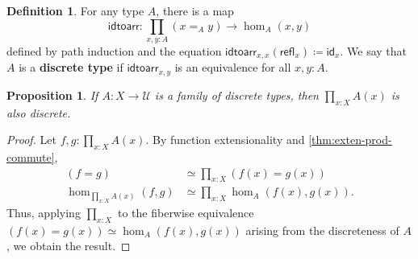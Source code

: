 \documentclass{amsart}
\theoremstyle{plain}
\newtheorem{prop}[thm]{Proposition}
\theoremstyle{definition}
\newtheorem{defn}[thm]{Definition}
\theoremstyle{remark}
\numberwithin{equation}{section}
\newcommand{\defeq}{\coloneqq}
\newcommand{\univtype}{\mathcal{U}}
\newcommand{\refl}{\mathsf{refl}}
\newcommand{\idtoarr}{\mathsf{idtoarr}}
\newcommand{\idarr}[1]{\mathsf{id}_{#1}}
\begin{document}
\begin{defn}\label{defn:discrete}
  For any type $A$, there is a map
  \[ \idtoarr: \prod_{x,y :A} (x =_A y) \to \hom_A(x,y)\]
  defined by path induction and the equation $\idtoarr_{x,x}(\refl_x) \defeq \idarr x$.
  We say that $A$ is a \textbf{discrete type} if $\idtoarr_{x,y}$ is an equivalence for all $x,y:A$.
\end{defn}

\begin{prop}\label{thm:forall-discrete} If $A:X\to\univtype$ is a family of discrete types, then $\prod_{x:X} A(x)$ is also discrete.
\end{prop}
\begin{proof}
  Let $f,g:\prod_{x:X} A(x)$.
  By function extensionality and \cref{thm:exten-prod-commute},
  \begin{align*}
    (f=g) &\simeq \prod_{x:X} (f(x)=g(x))\\
    \hom_{\prod_{x:X} A(x)}(f,g) &\simeq \prod_{x:X}\hom_A(f(x),g(x)).
  \end{align*}
  Thus, applying $\prod_{x:X}$ to the fiberwise equivalence $(f(x)=g(x))\simeq \hom_A(f(x),g(x))$ arising from the discreteness of $A$, we obtain the result.
\end{proof}
\end{document}
